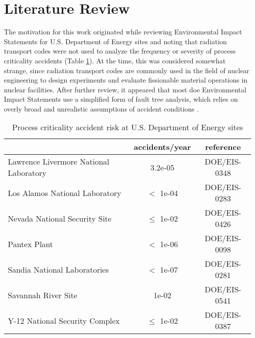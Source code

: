 
\section{Literature Review}

The motivation for this work originated while reviewing Environmental Impact Statements for U.S. Department of Energy sites and noting that radiation transport codes were not used to analyze the frequency or severity of process criticality accidents (Table \ref{table:doe}).
At the time, this was considered somewhat strange, since radiation transport codes are commonly used in the field of nuclear engineering to design experiments and evaluate fissionable material operations in nuclear facilities.
After further review, it appeared that most \gls{doe} Environmental Impact Statements use a simplified form of fault tree analysis, which relies on overly broad and unrealistic assumptions of accident conditions \cite{mattson}.

\begin{table}
  \caption{Process criticality accident risk at U.S. Department of Energy sites}
  \label{table:doe}
  \renewcommand\arraystretch{1.5}
  \begin{center}
    \begin{tabular}{|l c c|}
      \hline
                                             & accidents/year & reference \\
      \hline
      Lawrence Livermore National Laboratory & 3.2e-05        & DOE/EIS-0348 \\
      Los Alamos National Laboratory         & $<$ 1e-04      & DOE/EIS-0283 \\
      Nevada National Security Site          & $\leq$ 1e-02   & DOE/EIS-0426 \\
      Pantex Plant                           & $<$ 1e-06      & DOE/EIS-0098 \\
      Sandia National Laboratories           & $<$ 1e-07      & DOE/EIS-0281 \\
      Savannah River Site                    & 1e-02          & DOE/EIS-0541 \\
      Y-12 National Security Complex         & $\leq$ 1e-02   & DOE/EIS-0387 \\
      \hline
    \end{tabular}
  \end{center}
\end{table}

